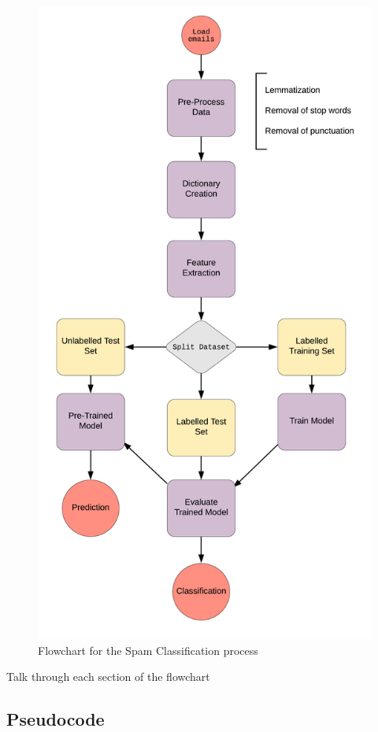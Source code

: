 \documentclass[11pt, a4paper]{article}
\begin{document}
\begin{figure}[h!]
\centering
\includegraphics[scale=0.2]{spam_flowchart}
\caption{Flowchart for the Spam Classification process}
\end{figure}

Talk through each section of the flowchart
\newpage
\subsection{Pseudocode}
\end{document}
